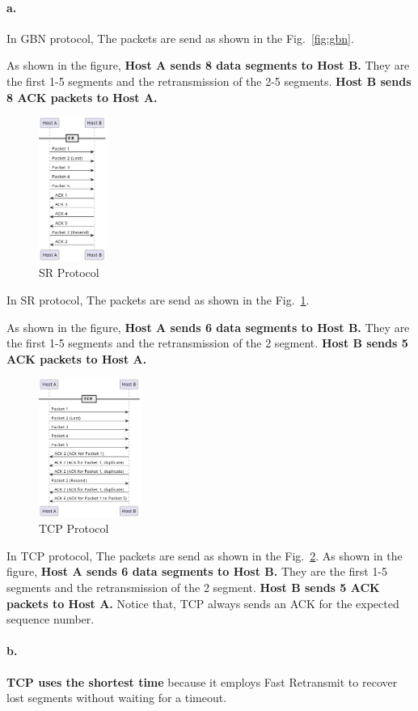 \documentclass{cshwk}
\begin{document}
\paragraph{a.} In GBN protocol, The packets are send as shown in the Fig.~\ref{fig:gbn}.

As shown in the figure, \textbf{Host A sends 8 data segments to Host B.} They are the first 1-5 segments and the retransmission of the 2-5 segments. \textbf{Host B sends 8 ACK packets to Host A. }

\begin{figure}[htbp]
    \centering
    \includegraphics[width=0.2\textwidth]{hw3-4-2.png}
    \caption{SR Protocol}
    \label{fig:sr}
\end{figure}
In SR protocol, The packets are send as shown in the Fig.~\ref{fig:sr}. 

As shown in the figure, \textbf{Host A sends 6 data segments to Host B.} They are the first 1-5 segments and the retransmission of the 2 segment. \textbf{Host B sends 5 ACK packets to Host A. }

\begin{figure}[htbp]
    \centering
    \includegraphics[width=0.3\textwidth]{hw3-4-3.png}
    \caption{TCP Protocol}
    \label{fig:tcp}
\end{figure}

In TCP protocol, The packets are send as shown in the Fig.~\ref{fig:tcp}.
As shown in the figure, \textbf{Host A sends 6 data segments to Host B.} They are the first 1-5 segments and the retransmission of the 2 segment. \textbf{Host B sends 5 ACK packets to Host A. } Notice that, TCP always sends an ACK for the expected sequence number.

\paragraph{b.} \textbf{TCP uses the shortest time} because it employs Fast Retransmit to recover lost segments without waiting for a timeout.
\end{document}
